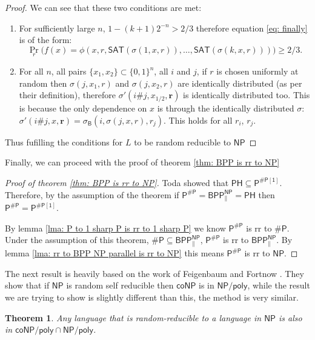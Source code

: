 \documentclass{article}
\newtheorem{theorem}{Theorem}
\begin{document}
\begin{proof}
We can see that these two conditions are met: 

\begin{enumerate}[label={(\arabic*)}]
        \item For sufficiently large $n$, $1-(k+1)2^{-n}>2/3$ therefore equation \ref{eq: finally} is of the form:
            \[
            \Pr_{r}\big(
            f(x)=\phi(x,r,\mathsf{SAT}(\sigma(1,x,r)),\ldots, \mathsf{SAT}(\sigma(k, x, r)))
            \big)\geq2/3.
            \]
        \item For all $n$, all pairs $\{x_1,x_2\}\subset \{0,1\}^n$, all $i$ and $j$, if $r$ is chosen uniformly at random then $\sigma(j,x_1,r)$ and $\sigma(j,x_2,r)$ are identically distributed (as per their definition), therefore $\sigma'(i\#j,x_{1/2},\mathbf{r})$ is identically distributed too. This is because the only dependence on $x$ is through the identically distributed $\sigma$: $\sigma'(i\#j,x,\mathbf{r})= \sigma_\mathsf{B}(i, \sigma(j, x, r), r_j)$. This holds for all $r_i$, $r_j$. 
    \end{enumerate}
Thus fufilling the conditions for $L$ to be random reducible to $\mathsf{NP}$
\end{proof}

Finally, we can proceed with the proof of theorem \ref{thm: BPP is rr to NP}

\begin{proof}[Proof of theorem \ref{thm: BPP is rr to NP}]
Toda \cite{toda1991pp} showed that $\mathsf{PH\subseteq P^{\# P[1]}}$. Therefore, by the assumption of the theorem if $\mathsf{P^{\# P}= BPP_{\parallel}^{NP}=PH}$ then $\mathsf{P^{\# P} = P^{\# P[1]}}$. 

By lemma \ref{lma: P to 1 sharp P is rr to 1 sharp P} we know $\mathsf{P^{\# P}}$ is rr to $\mathsf{\# P}$. Under the assumption of this theorem, $\mathsf{\# P \subseteq BPP^{NP}_{\parallel}}$, $\mathsf{P^{\# P}}$ is rr to $\mathsf{BPP^{NP}_{\parallel}}$. By lemma \ref{lma: rr to BPP NP parallel is rr to NP} this means $\mathsf{P^{\# P}}$ is rr to $\mathsf{NP}$.
\end{proof}

The next result is heavily based on the work of Feigenbaum and Fortnow \cite{feigenbaum1990random}. They show that if $\mathsf{NP}$ is random self reducible then $\mathsf{coNP}$ is in $\mathsf{NP/poly}$, while the result we are trying to show is slightly different than this, the method is very similar.

\begin{theorem}\label{thm: rr to NP is NP/poly}
    Any language that is random-reducible to a language in $\mathsf{NP}$ is also in $\mathsf{coNP/poly \cap NP/poly}$.
\end{theorem}
\end{document}
